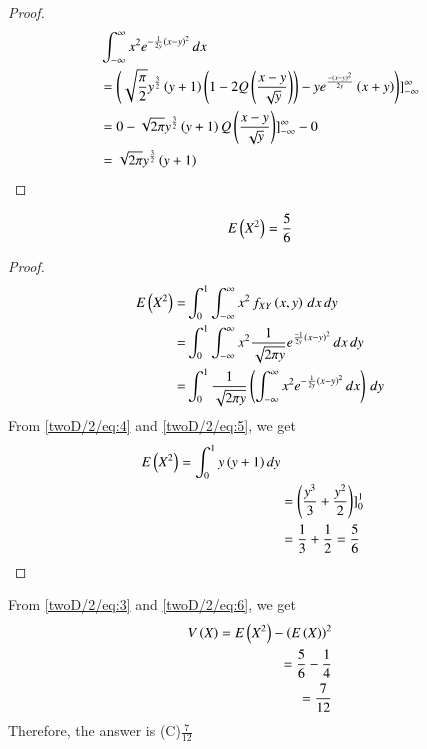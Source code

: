\begin{proof}
\begin{align}
&\int_{-\infty}^{\infty}x^2e^{-\frac{1}{2y}\brak{x-y}^2}\,dx\\
&=\brak{\sqrt{\frac{\pi}{2}}y^\frac{3}{2}\brak{y+1}\brak{1-2Q\brak{\frac{x-y}{\sqrt{y}}}} - ye^\frac{-\brak{x-y}^2}{2y}\brak{x+y}}]_{-\infty}^{\infty}\\
&=0-\sqrt{2\pi}y^\frac{3}{2}\brak{y+1}Q\brak{\frac{x-y}{\sqrt{y}}}]_{-\infty}^{\infty} - 0\\
&=\sqrt{2\pi}y^\frac{3}{2}\brak{y+1} \label{twoD/2/eq:5}
\end{align}
\end{proof}
\begin{lemma}
\begin{align}
E\left(X^2\right) = \frac{5}{6}
\end{align}
\end{lemma}
\begin{proof}
\begin{align}
 E\brak{X^2}=&\int_{0}^{1}\int_{-\infty}^{\infty}x^2\,f_{XY}\brak{x, y}\,dx\,dy\\   
 =&\int_{0}^{1}\int_{-\infty}^{\infty}x^2\frac{1}{\sqrt{2\pi y}}e^{\frac{-1}{2y}\brak{x-y}^2}\,dx \,dy\\
 =&\int_{0}^{1}\frac{1}{\sqrt{2\pi y}}\brak{\int_{-\infty}^{\infty}x^2e^{-\frac{1}{2y}\brak{x-y}^2}\,dx}\,dy
 \label{twoD/2/eq:4}
\end{align}
From \eqref{twoD/2/eq:4} and \eqref{twoD/2/eq:5}, we get
\begin{align}
E\brak{X^2} = \int_{0}^{1}y\brak{y+1}dy\\
&=\brak{\frac{y^3}{3}+\frac{y^2}{2}}]_{0}^{1}\\
&=\frac{1}{3}+\frac{1}{2}=\frac{5}{6} \label{twoD/2/eq:6}
\end{align}
\end{proof}
From \eqref{twoD/2/eq:3} and \eqref{twoD/2/eq:6}, we get
\begin{align}
V\left(X\right) = E\left(X^2\right) - \left(E\left(X\right)\right)^2\\
     = \frac{5}{6} - \frac{1}{4}\\
     = \frac{7}{12}
\end{align}
Therefore, the answer is (C)$\frac{7}{12}$